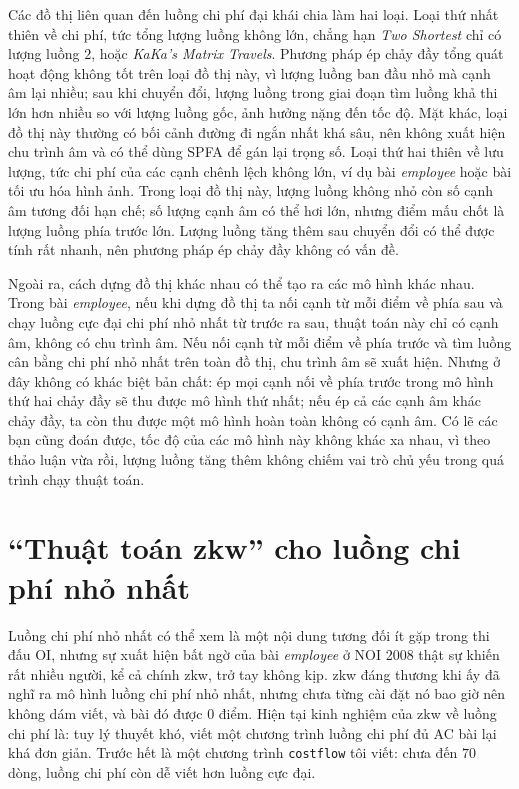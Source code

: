\documentclass[11pt]{article}
\begin{document}
Các đồ thị liên quan đến luồng chi phí đại khái chia làm hai loại. Loại thứ
nhất thiên về chi phí, tức tổng lượng luồng không lớn, chẳng hạn \textit{Two
Shortest} chỉ có lượng luồng $2$, hoặc \textit{KaKa's Matrix Travels}. Phương
pháp ép chảy đầy tổng quát hoạt động không tốt trên loại đồ thị này, vì lượng
luồng ban đầu nhỏ mà cạnh âm lại nhiều; sau khi chuyển đổi, lượng luồng trong
giai đoạn tìm luồng khả thi lớn hơn nhiều so với lượng luồng gốc, ảnh hưởng
nặng đến tốc độ. Mặt khác, loại đồ thị này thường có bối cảnh đường đi ngắn
nhất khá sâu, nên không xuất hiện chu trình âm và có thể dùng SPFA để gán lại
trọng số. Loại thứ hai thiên về lưu lượng, tức chi phí của các cạnh chênh lệch
không lớn, ví dụ bài \textit{employee} hoặc bài tối ưu hóa hình ảnh. Trong
loại đồ thị này, lượng luồng không nhỏ còn số cạnh âm tương đối hạn chế; số
lượng cạnh âm có thể hơi lớn, nhưng điểm mấu chốt là lượng luồng phía trước
lớn. Lượng luồng tăng thêm sau chuyển đổi có thể được tính rất nhanh, nên
phương pháp ép chảy đầy không có vấn đề.

Ngoài ra, cách dựng đồ thị khác nhau có thể tạo ra các mô hình khác nhau.
Trong bài \textit{employee}, nếu khi dựng đồ thị ta nối cạnh từ mỗi điểm về
phía sau và chạy luồng cực đại chi phí nhỏ nhất từ trước ra sau, thuật toán
này chỉ có cạnh âm, không có chu trình âm. Nếu nối cạnh từ mỗi điểm về phía
trước và tìm luồng cân bằng chi phí nhỏ nhất trên toàn đồ thị, chu trình âm sẽ
xuất hiện. Nhưng ở đây không có khác biệt bản chất: ép mọi cạnh nối về phía
trước trong mô hình thứ hai chảy đầy sẽ thu được mô hình thứ nhất; nếu ép cả
các cạnh âm khác chảy đầy, ta còn thu được một mô hình hoàn toàn không có cạnh
âm. Có lẽ các bạn cũng đoán được, tốc độ của các mô hình này không khác xa
nhau, vì theo thảo luận vừa rồi, lượng luồng tăng thêm không chiếm vai trò chủ
yếu trong quá trình chạy thuật toán.

\section{``Thuật toán zkw'' cho luồng chi phí nhỏ nhất}

Luồng chi phí nhỏ nhất có thể xem là một nội dung tương đối ít gặp trong thi
đấu OI, nhưng sự xuất hiện bất ngờ của bài \textit{employee} ở NOI 2008 thật
sự khiến rất nhiều người, kể cả chính zkw, trở tay không kịp. zkw đáng thương
khi ấy đã nghĩ ra mô hình luồng chi phí nhỏ nhất, nhưng chưa từng cài đặt nó
bao giờ nên không dám viết, và bài đó được $0$ điểm. Hiện tại kinh nghiệm của
zkw về luồng chi phí là: tuy lý thuyết khó, viết một chương trình luồng chi
phí đủ AC bài lại khá đơn giản. Trước hết là một chương trình \texttt{costflow}
tôi viết: chưa đến $70$ dòng, luồng chi phí còn dễ viết hơn luồng cực đại.
\end{document}
